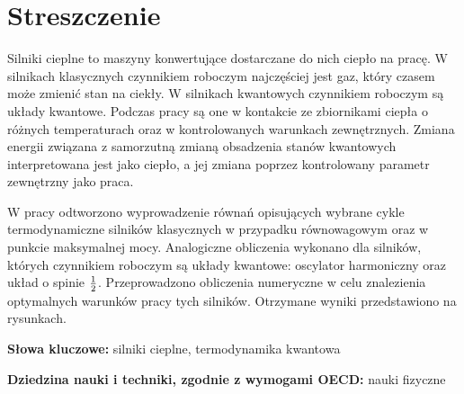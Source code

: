 \chapter*{Streszczenie}




Silniki cieplne to maszyny konwertujące dostarczane do nich ciepło na pracę. W silnikach klasycznych czynnikiem roboczym najczęściej jest gaz, który czasem może zmienić stan na ciekły. W silnikach kwantowych czynnikiem roboczym są układy kwantowe. Podczas pracy są one w kontakcie ze zbiornikami ciepła o różnych temperaturach oraz w kontrolowanych warunkach zewnętrznych. Zmiana energii związana z samorzutną zmianą obsadzenia stanów kwantowych interpretowana jest jako ciepło, a jej zmiana poprzez kontrolowany parametr zewnętrzny jako praca.

W pracy odtworzono wyprowadzenie równań opisujących wybrane cykle termodynamiczne silników klasycznych w przypadku równowagowym oraz w punkcie maksymalnej mocy. Analogiczne obliczenia wykonano dla silników, których czynnikiem roboczym są układy kwantowe: oscylator harmoniczny oraz układ o spinie \(\frac{1}{2}\). Przeprowadzono obliczenia numeryczne w celu znalezienia optymalnych warunków pracy tych silników. Otrzymane wyniki przedstawiono na rysunkach.

\bigskip
\noindent
\textbf{Słowa kluczowe:} silniki cieplne, termodynamika kwantowa

\bigskip
\noindent
\textbf{Dziedzina nauki i techniki, zgodnie z wymogami OECD:}
nauki fizyczne
